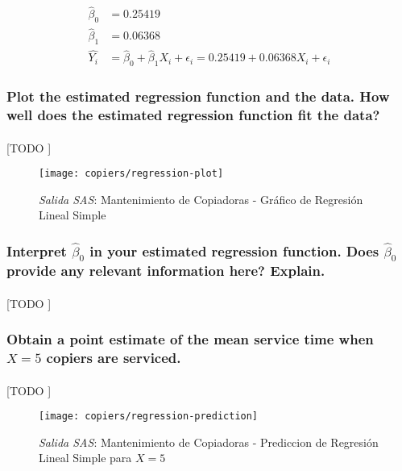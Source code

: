 \documentclass{article}
\begin{document}
        \begin{align}
          \widehat{\beta}_0 &= 0.25419\\
          \widehat{\beta}_1 &= 0.06368\\
          \widehat{Y_i} &= \widehat{\beta}_0 +\widehat{\beta}_1X_i + \epsilon_i = 0.25419 + 0.06368 X_i + \epsilon_i
        \end{align}

      \subsubsection{Plot the estimated regression function and the data. How well does the estimated regression function fit the data?}

        \paragraph{}
        [TODO ]

        \begin{figure}[!h]
          \centering
          \texttt{[image: copiers/regression-plot]}
          \caption{\emph{Salida SAS}: Mantenimiento de Copiadoras - Gráfico de Regresión Lineal Simple}
          \label{img:copiers-regression-plot}
        \end{figure}

      \subsubsection{Interpret $\widehat{\beta}_0$ in your estimated regression function. Does $\widehat{\beta}_0$ provide any relevant information here? Explain.}

        \paragraph{}
        [TODO ]


      \subsubsection{Obtain a point estimate of the mean service time when $X = 5$ copiers are serviced.}

        \paragraph{}
        [TODO ]

        \begin{figure}[!h]
          \centering
          \texttt{[image: copiers/regression-prediction]}
          \caption{\emph{Salida SAS}: Mantenimiento de Copiadoras - Prediccion de Regresión Lineal Simple para $X = 5$}
          \label{img:copiers-regression-prediction}
        \end{figure}
\end{document}
